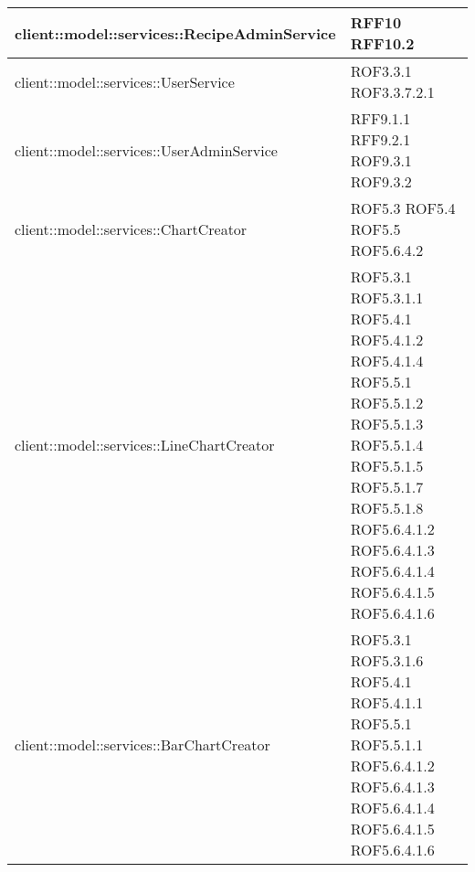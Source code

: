 \begin{center}
\begin{longtable}{| p{11cm} | p{2.5cm} |}
\hline
client::model::services::RecipeAdminService & RFF10 \newline RFF10.2 \\
\hline
client::model::services::UserService & ROF3.3.1 \newline ROF3.3.7.2.1 \\
\hline
client::model::services::UserAdminService & RFF9.1.1 \newline RFF9.2.1 \newline ROF9.3.1 \newline ROF9.3.2 \\
\hline
client::model::services::ChartCreator & ROF5.3 \newline ROF5.4 \newline ROF5.5 \newline ROF5.6.4.2 \\
\hline
client::model::services::LineChartCreator & ROF5.3.1 \newline ROF5.3.1.1 \newline ROF5.4.1 \newline ROF5.4.1.2 \newline ROF5.4.1.4 \newline ROF5.5.1 \newline ROF5.5.1.2 \newline ROF5.5.1.3 \newline ROF5.5.1.4 \newline ROF5.5.1.5 \newline ROF5.5.1.7 \newline ROF5.5.1.8 \newline ROF5.6.4.1.2 \newline ROF5.6.4.1.3 \newline ROF5.6.4.1.4 \newline ROF5.6.4.1.5 \newline ROF5.6.4.1.6 \\
\hline
client::model::services::BarChartCreator & ROF5.3.1 \newline ROF5.3.1.6 \newline ROF5.4.1 \newline ROF5.4.1.1 \newline ROF5.5.1 \newline ROF5.5.1.1 \newline ROF5.6.4.1.2 \newline ROF5.6.4.1.3 \newline ROF5.6.4.1.4 \newline ROF5.6.4.1.5 \newline ROF5.6.4.1.6 \\

\end{longtable}
\end{center}
